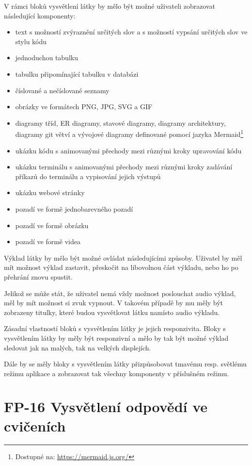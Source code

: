 V rámci bloků vysvětlení látky by mělo být možné uživateli zobrazovat následující komponenty:

\begin{itemize}
    \item text s možností zvýraznění určitých slov a s možností vypsání určitých slov ve stylu kódu
    \item jednoduchou tabulku
    \item tabulku připomínající tabulku v databázi
    \item číslované a nečíslované seznamy
    \item obrázky ve formátech PNG, JPG, SVG a GIF
    \item diagramy tříd, ER diagramy, stavové diagramy, diagramy architektury, diagramy git větví a vývojové diagramy definované pomocí jazyka Mermaid\footnote{Dostupné na: \href{https://mermaid.js.org/}{https://mermaid.js.org/}}
    \item ukázku kódu s animovanými přechody mezi různými kroky upravování kódu
    \item ukázku terminálu s animovanými přechody mezi různými kroky zadávání příkazů do terminálu a vypisování jejich výstupů
    \item ukázku webové stránky
    \item pozadí ve formě jednobarevného pozadí
    \item pozadí ve formě obrázku
    \item pozadí ve formě videa
\end{itemize}

Výklad látky by mělo být možné ovládat následujícími způsoby. Uživatel by měl mít možnost výklad zastavit, přeskočit na libovolnou část výkladu, nebo ho po přehrání znovu spustit. 

Jelikož se může stát, že uživatel nemá vždy možnost poslouchat audio výklad, měl by mít možnost si zvuk vypnout. V takovém případě by mu měly být zobrazeny titulky, které budou vysvětlovat látku namísto audio výkladu.

Zásadní vlastností bloků s vysvětlením látky je jejich responzivita. Bloky s vysvětlením látky by měly být responzivní a mělo by tak být možné výklad sledovat jak na malých, tak na velkých displejích.

Dále by se měly bloky s vysvětlením látky přizpůsobovat tmavému resp. světlému režimu aplikace a zobrazovat tak všechny komponenty v příslušném režimu. 

\section{FP-16 Vysvětlení odpovědí ve cvičeních}\label{sec:fp-answer-explanation}

